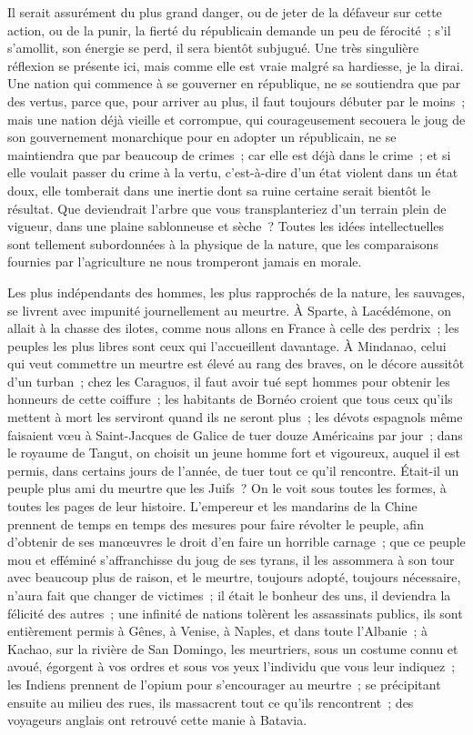 \documentclass[french,twoside]{book} %
\begin{document}
Il serait assurément du plus grand danger, ou de jeter de la défaveur sur cette action, ou de la punir, la fierté du républicain demande un peu de férocité ; s’il s’amollit, son énergie se perd, il sera bientôt subjugué. Une très singulière réflexion se présente ici, mais comme elle est vraie malgré sa hardiesse, je la dirai. Une nation qui commence à se gouverner en république, ne se soutiendra que par des vertus, parce que, pour arriver au plus, il faut toujours débuter par le moins ; mais une nation déjà vieille et corrompue, qui courageusement secouera le joug de son gouvernement monarchique pour en adopter un républicain, ne se maintiendra que par beaucoup de crimes ; car elle est déjà dans le crime ; et si elle voulait passer du crime à la vertu, c’est-à-dire d’un état violent dans un état doux, elle tomberait dans une inertie dont sa ruine certaine serait bientôt le résultat. Que deviendrait l’arbre que vous transplanteriez d’un terrain plein de vigueur, dans une plaine sablonneuse et sèche ? Toutes les idées intellectuelles sont tellement subordonnées à la physique de la nature, que les comparaisons fournies par l’agriculture ne nous tromperont jamais en morale.\par
Les plus indépendants des hommes, les plus rapprochés de la nature, les sauvages, se livrent avec impunité journellement au meurtre. À Sparte, à Lacédémone, on allait à la chasse des ilotes, comme nous allons en France à celle des perdrix ; les peuples les plus libres sont ceux qui l’accueillent davantage. À Mindanao, celui qui veut commettre un meurtre est élevé au rang des braves, on le décore aussitôt d’un turban ; chez les Caraguos, il faut avoir tué sept hommes pour obtenir les honneurs de cette coiffure ; les habitants de Bornéo croient que tous ceux qu’ils mettent à mort les serviront quand ils ne seront plus ; les dévots espagnols même faisaient vœu à Saint-Jacques de Galice de tuer douze Américains par jour ; dans le royaume de Tangut, on choisit un jeune homme fort et vigoureux, auquel il est permis, dans certains jours de l’année, de tuer tout ce qu’il rencontre. Était-il un peuple plus ami du meurtre que les Juifs ? On le voit sous toutes les formes, à toutes les pages de leur histoire. L’empereur et les mandarins de la Chine prennent de temps en temps des mesures pour faire révolter le peuple, afin d’obtenir de ses manœuvres le droit d’en faire un horrible carnage ; que ce peuple mou et efféminé s’affranchisse du joug de ses tyrans, il les assommera à son tour avec beaucoup plus de raison, et le meurtre, toujours adopté, toujours nécessaire, n’aura fait que changer de victimes ; il était le bonheur des uns, il deviendra la félicité des autres ; une infinité de nations tolèrent les assassinats publics, ils sont entièrement permis à Gênes, à Venise, à Naples, et dans toute l’Albanie ; à Kachao, sur la rivière de San Domingo, les meurtriers, sous un costume connu et avoué, égorgent à vos ordres et sous vos yeux l’individu que vous leur indiquez ; les Indiens prennent de l’opium pour s’encourager au meurtre ; se précipitant ensuite au milieu des rues, ils massacrent tout ce qu’ils rencontrent ; des voyageurs anglais ont retrouvé cette manie à Batavia.\par
\end{document}
